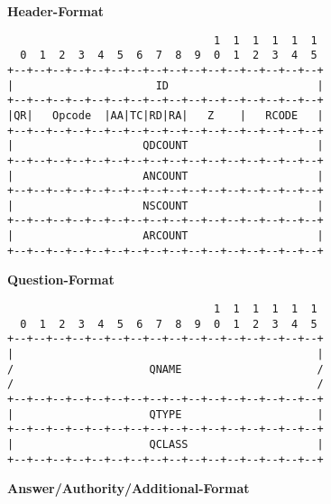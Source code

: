 \documentclass{article}
\begin{document}
\pagestyle{empty}
\centering
\textbf{\Large Header-Format}
\begin{center}
\begin{varwidth}{\textwidth}
\begin{verbatim}
                                1  1  1  1  1  1
  0  1  2  3  4  5  6  7  8  9  0  1  2  3  4  5
+--+--+--+--+--+--+--+--+--+--+--+--+--+--+--+--+
|                      ID                       |
+--+--+--+--+--+--+--+--+--+--+--+--+--+--+--+--+
|QR|   Opcode  |AA|TC|RD|RA|   Z    |   RCODE   |
+--+--+--+--+--+--+--+--+--+--+--+--+--+--+--+--+
|                    QDCOUNT                    |
+--+--+--+--+--+--+--+--+--+--+--+--+--+--+--+--+
|                    ANCOUNT                    |
+--+--+--+--+--+--+--+--+--+--+--+--+--+--+--+--+
|                    NSCOUNT                    |
+--+--+--+--+--+--+--+--+--+--+--+--+--+--+--+--+
|                    ARCOUNT                    |
+--+--+--+--+--+--+--+--+--+--+--+--+--+--+--+--+
\end{verbatim}
\end{varwidth}
\end{center}
\vfill
\textbf{\Large Question-Format}
\begin{center}
\begin{varwidth}{\textwidth}
\begin{verbatim}
                                1  1  1  1  1  1
  0  1  2  3  4  5  6  7  8  9  0  1  2  3  4  5
+--+--+--+--+--+--+--+--+--+--+--+--+--+--+--+--+
|                                               |
/                     QNAME                     /
/                                               /
+--+--+--+--+--+--+--+--+--+--+--+--+--+--+--+--+
|                     QTYPE                     |
+--+--+--+--+--+--+--+--+--+--+--+--+--+--+--+--+
|                     QCLASS                    |
+--+--+--+--+--+--+--+--+--+--+--+--+--+--+--+--+
\end{verbatim}
\end{varwidth}
\end{center}
\vfill
\textbf{\Large Answer/Authority/Additional-Format}
\end{document}

